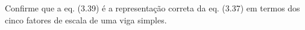 Confirme que a eq. (3.39) é a representação correta da eq. (3.37) em termos dos cinco fatores de escala de uma viga simples.

